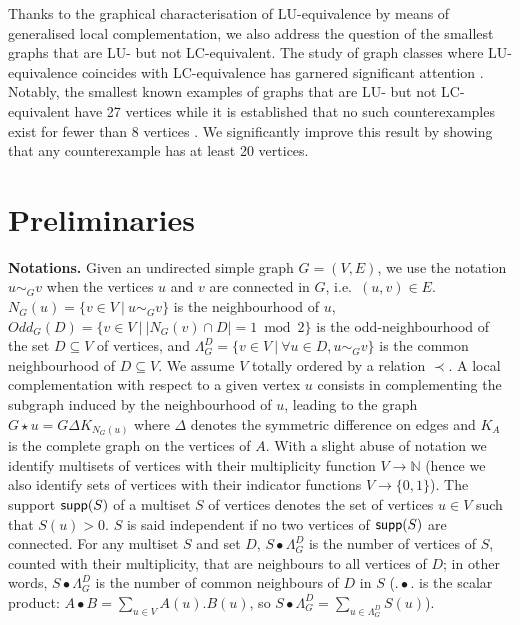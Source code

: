 \documentclass[a4paper,UKenglish,cleveref,autoref,thm-restate]{arxiv}
\newcommand{\supp}{\textup{\textsf{supp}}}
\begin{document}
Thanks to the graphical characterisation of LU-equivalence by means of generalised local complementation, we also address the question of the smallest graphs that are LU- but not LC-equivalent. The study of graph classes where LU-equivalence coincides with LC-equivalence has garnered significant attention  
\cite{Hein04, Hein06, VandenNest05,Zeng07,Ji07,CABELLO20092219,tzitrin2018local,claudet2024local,burchardt2024algorithmverifylocalequivalence}. Notably, the smallest known examples of graphs that are LU- but not LC-equivalent have 27 vertices while it is established that no such counterexamples exist for fewer than 8 vertices \cite{CABELLO20092219}. We significantly  improve this result by showing that any counterexample has at least 20 vertices.  

\section{Preliminaries}

{\bf Notations.} Given an undirected simple graph $G=(V,E)$, we use the notation $u\sim_G v$ when the vertices $u$ and $v$ are connected in $G$, i.e.~$(u,v)\in E$. $N_G(u)=\{v\in V~|~u\sim_G v\}$ is the neighbourhood of $u$, $Odd_G(D) = \{v \in V~|~|N_G(v)\cap D|=1\bmod 2\}$ is the odd-neighbourhood of the set $D\subseteq V$ of vertices, and $\Lambda _G^D = \{v\in V~|~ \forall u\in D, u\sim_G v\}$ is the common neighbourhood of $D\subseteq V$. We assume $V$  totally ordered by a relation $\prec$. A local complementation with respect to a given vertex $u$ consists in complementing the subgraph induced by the neighbourhood of $u$, leading to the graph $G\star u= G\Delta K_{N_G(u)}$ where $\Delta$ denotes the symmetric difference on edges and $K_A$ is the complete graph on the vertices of $A$. With a slight abuse of notation we identify multisets of vertices with their multiplicity function $V\to \mathbb N$ (hence we also identify sets of vertices with their indicator functions $V\to \{0,1\}$). The support $\supp(S)$ of a multiset $S$ of vertices denotes the set of vertices $u \in V$ such that $S(u) > 0$. $S$ is said independent if no two vertices of $\supp(S)$ are connected.
For any multiset $S$ and set $D$, $S\bullet \Lambda_G^D$ is the number of vertices of $S$, counted with their multiplicity, that are neighbours to all vertices of $D$;  in other words, $S\bullet \Lambda_G^D$ is  the number of common neighbours of $D$ in $S$ ($.\bullet.$ is the scalar product: $A\bullet B = \sum_{u\in V}A(u).B(u)$, so $S\bullet \Lambda_G^D = \sum_{u \in \Lambda_G^D}S(u)$).
\end{document}
